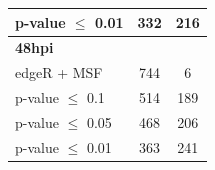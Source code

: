 \documentclass[10pt,a4paper,twocolumn]{article}
\begin{document}
\begin{table}[]
\begin{tabular}{lll}
			\multicolumn{1}{|l|}{p-value $\leq$ 0.01} & \multicolumn{1}{c|}{332}                                             & \multicolumn{1}{c|}{216}              \\ \hline
			\multicolumn{1}{|l|}{\textbf{48hpi}}              & \multicolumn{1}{c|}{}                                                & \multicolumn{1}{c|}{}                 \\ \hline
			\multicolumn{1}{|l|}{edgeR + MSF}                 & \multicolumn{1}{c|}{744}                                             & \multicolumn{1}{c|}{6}                \\ \hline
			\multicolumn{1}{|l|}{p-value $\leq$ 0.1}  & \multicolumn{1}{c|}{514}                                             & \multicolumn{1}{c|}{189}               \\ \hline
			\multicolumn{1}{|l|}{p-value $\leq$ 0.05} & \multicolumn{1}{c|}{468}                                             & \multicolumn{1}{c|}{206}               \\ \hline
			\multicolumn{1}{|l|}{p-value $\leq$ 0.01} & \multicolumn{1}{c|}{363}                                             & \multicolumn{1}{c|}{241}               \\ \hline
		\end{tabular}
	\end{table}
	
	
	
	
\end{document}
